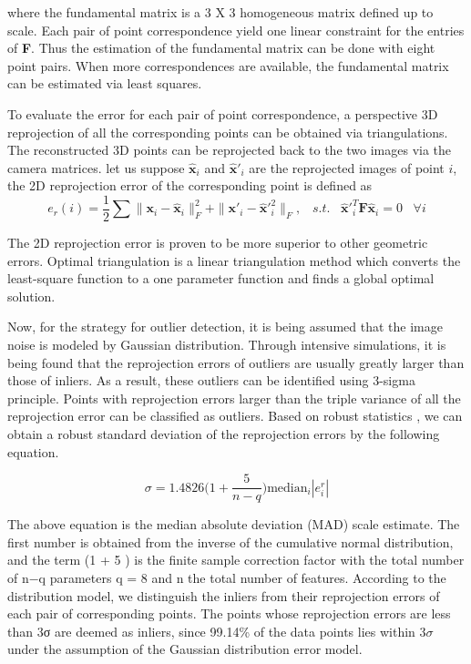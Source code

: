 where the fundamental matrix is a 3 X 3 homogeneous matrix defined up to scale. Each pair of point correspondence yield one linear constraint for the entries of \textbf{F}. Thus the estimation of the fundamental matrix can be done with eight point pairs. When more correspondences are available, the fundamental matrix can be estimated via least squares. 

To evaluate the error for each pair of point correspondence, a perspective 3D reprojection of all the corresponding points can be obtained via triangulations. The reconstructed 3D points can be reprojected back to the two images via the camera matrices. let us suppose $\mathbf{\hat{x}}_i$ and $\mathbf{\hat{x}}'_i$ are the reprojected images of point $i$, the 2D reprojection error of the corresponding point is defined as
\begin{equation}
e_{r}(i) = \frac{1}{2} \sum \|\mathbf{x}_i-\mathbf{\hat{x}}_i\|^2_F + \|\mathbf{x}'_i-\mathbf{\hat{x}}'^2_i\|_F, \;\;\;s.t.\;\;\; 
\mathbf{\hat{x}}'^T_i \mathbf{F} \mathbf{\hat{x}}_i=0 \;\;\; \forall i
\end{equation}


The 2D reprojection error is proven to be more superior to other geometric errors. Optimal triangulation is a linear triangulation method which converts the least-square function to a one parameter function and finds a global optimal solution.

Now, for the strategy for outlier detection, it is being assumed that the image noise is modeled by Gaussian distribution. Through intensive simulations, it is being found that the reprojection errors of outliers are usually greatly larger than those of inliers. As a result, these outliers can be identified using 3-sigma principle. Points with reprojection errors larger than the triple variance of all the reprojection error can be classified as outliers. Based on robust statistics \cite{ming}, we can obtain a robust standard deviation of the reprojection errors by the following equation.

\begin{equation}
\sigma = 1.4826 \Big(1+\frac{5}{n-q}\Big)\text{median}_i|e^r_i|
\end{equation}

The above equation is the median absolute deviation (MAD) scale estimate.
The first number is obtained from the inverse of the cumulative normal distribution,
and the term (1 + 5 ) is the finite sample correction factor with the total number of n−q
parameters q = 8 and n the total number of features. According to the distribution model, we distinguish the inliers from their reprojection errors of each pair of corresponding points. The points whose reprojection errors are less than 3σ are deemed as inliers, since 99.14{\%} of the data points lies within 3$\sigma$ under the assumption of the Gaussian distribution error model.


